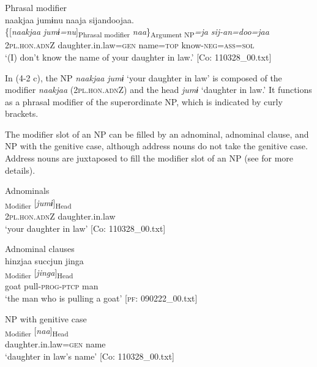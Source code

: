 \ex\label{ex:4.2c}Phrasal modifier\\
\glll      naakjaa  jumɨnu  naaja  sijandoojaa.\\
      \{[\textit{naakjaa}  \textit{jumɨ=nu}]\textsubscript{Phrasal modifier}  \textit{naa}\}\textsubscript{Argument NP}\textit{=ja}  \textit{sij-an=doo=jaa}\\
      2\textsc{pl}.\textsc{hon}.\textsc{adn}Z  daughter.in.law=\textsc{gen}  name=\textsc{top}  know-\textsc{neg}=\textsc{ass}=\textsc{sol}\\
      \glt       ‘(I) don’t know the name of your daughter in law.’ [Co: 110328\_00.txt]
    \z
\z

In (4-2 c), the NP \textit{naakjaa} \textit{jumɨ} ‘your daughter in law’ is composed of the modifier \textit{naakjaa} (2\textsc{pl}.\textsc{hon}.\textsc{adn}Z) and the head \textit{jumɨ} ‘daughter in law.’ It functions as a phrasal modifier of the superordinate NP, which is indicated by curly brackets.

The modifier slot of an NP can be filled by an adnominal, adnominal clause, and NP with the genitive case, although address nouns do not take the genitive case. Address nouns are juxtaposed to fill the modifier slot of an NP (see  for more details).

\ea\label{ex:4.3} 
\ea Adnominals\label{ex:4.3a}\\
 \textsubscript{Modifier}  [\textit{jumɨ}]\textsubscript{Head}\\
      2\textsc{pl}.\textsc{hon}.\textsc{adn}Z  daughter.in.law\\
      \glt ‘your daughter in law’   [Co: 110328\_00.txt]

\ex\label{ex:4.3b} Adnominal clauses\\
\glll      hinzjaa  succjun  jinga\\
      [\textit{hinzjaa}  \textit{sukk-tur-n}]\textsubscript{Modifier}  [\textit{jinga}]\textsubscript{Head}\\
      goat  pull-\textsc{prog}-\textsc{ptcp}  man\\
      \glt       ‘the man who is pulling a goat’ [\textsc{pf}: 090222\_00.txt]

\ex\label{ex:4.3c}  NP with genitive case\\
    \gll  [\textit{jumɨ=nu}]\textsubscript{Modifier}  [\textit{naa}]\textsubscript{Head}\\
      daughter.in.law=\textsc{gen}  name\\
      \glt       ‘daughter in law’s name’ [Co: 110328\_00.txt]

